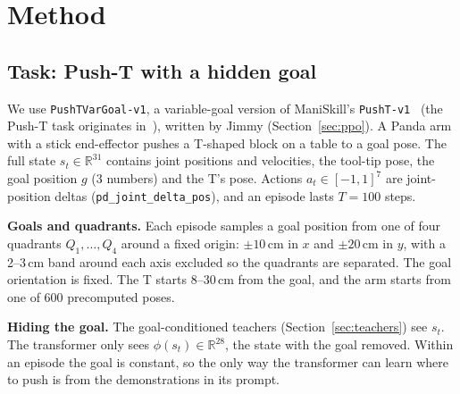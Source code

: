 
\providecommand{\inprogress}[1]{\textcolor{red}{[In progress: #1]}}

\section{Method}
\label{sec:method}

\subsection{Task: Push-T with a hidden goal}
\label{sec:task}
We use \texttt{PushTVarGoal-v1}, a variable-goal version of ManiSkill's \texttt{PushT-v1}~\cite{tao2024maniskill3}
(the Push-T task originates in~\cite{florence2021implicit}), written by Jimmy (Section~\ref{sec:ppo}). A Panda arm with a stick
end-effector pushes a T-shaped block on a table to a goal pose. The full state $s_t \in \mathbb{R}^{31}$ contains joint positions and
velocities, the tool-tip pose, the goal position $g$ (3 numbers) and the T's pose. Actions $a_t \in [-1,1]^7$ are joint-position
deltas (\texttt{pd\_joint\_delta\_pos}), and an episode lasts $T = 100$ steps.

\textbf{Goals and quadrants.} Each episode samples a goal position from one of four quadrants $Q_1,\dots,Q_4$ around a fixed
origin: $\pm 10$\,cm in $x$ and $\pm 20$\,cm in $y$, with a 2--3\,cm band around each axis excluded so the quadrants are
separated. The goal orientation is fixed. %
The T starts 8--30\,cm from the goal, and the arm starts from one of 600 precomputed poses.

\textbf{Hiding the goal.} The goal-conditioned teachers (Section~\ref{sec:teachers}) see $s_t$. The transformer only sees
$\phi(s_t) \in \mathbb{R}^{28}$, the state with the goal removed. Within an episode the goal is constant, so the only way the
transformer can learn where to push is from the demonstrations in its prompt.


